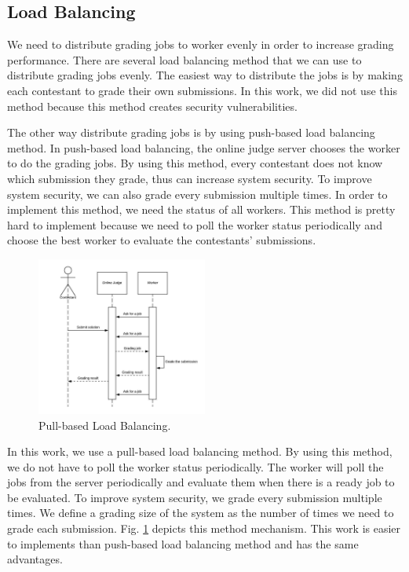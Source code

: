 \documentclass[conference,a4paper]{IEEEtran}
\begin{document}
\subsection{Load Balancing}

We need to distribute grading jobs to worker evenly in order to increase grading performance. There are several load balancing method that we can use to distribute grading jobs evenly. The easiest way to distribute the jobs is by making each contestant to grade their own submissions. In this work, we did not use this method because this method creates security vulnerabilities.

The other way distribute grading jobs is by using push-based load balancing method. In push-based load balancing, the online judge server chooses the worker to do the grading jobs. By using this method, every contestant does not know which submission they grade, thus can increase system security. To improve system security, we can also grade every submission multiple times. In order to implement this method, we need the status of all workers. This method is pretty hard to implement because we need to poll the worker status periodically and choose the best worker to evaluate the contestants' submissions.

\begin{figure}[htbp]
\centerline{\includegraphics[width=0.5\textwidth]{images/paper-pull-based-load-balancing.jpeg}}
\caption{Pull-based Load Balancing.}
\label{pull-based-load-balancing}
\end{figure}

In this work, we use a pull-based load balancing method. By using this method, we do not have to poll the worker status periodically. The worker will poll the jobs from the server periodically and evaluate them when there is a ready job to be evaluated. To improve system security, we grade every submission multiple times. We define a grading size of the system as the number of times we need to grade each submission. Fig. \ref{pull-based-load-balancing} depicts this method mechanism. This work is easier to implements than push-based load balancing method and has the same advantages.
\end{document}
